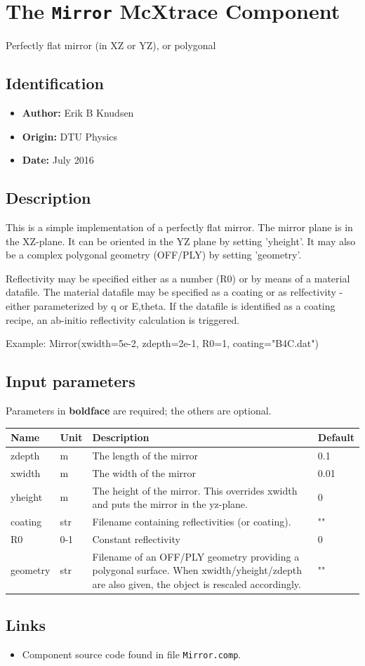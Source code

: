 \section{The \texttt{Mirror} McXtrace Component}
Perfectly flat mirror (in XZ or YZ), or polygonal

\subsection*{Identification}
\begin{itemize}
  \item \textbf{Author:} Erik B Knudsen
  \item \textbf{Origin:} DTU Physics
  \item \textbf{Date:} July 2016
\end{itemize}

\subsection*{Description}
This is a simple implementation of a perfectly flat mirror. The mirror plane is in the XZ-plane. It can be oriented in the YZ plane by setting 'yheight'. It may also be a complex polygonal geometry (OFF/PLY) by setting 'geometry'.

Reflectivity may be specified either as a number (R0) or by means of a material datafile. The material datafile may be specified as a coating or as relfectivity - either parameterized by q or E,theta. If the datafile is identified as a coating recipe, an ab-initio reflectivity calculation is triggered.

Example: Mirror(xwidth=5e-2, zdepth=2e-1, R0=1, coating="B4C.dat")

\subsection*{Input parameters}
Parameters in \textbf{boldface} are required; the others are optional.

\begin{longtable}{p{}p{}p{}p{}}
\toprule
\textbf{Name} & \textbf{Unit} & \textbf{Description} & \textbf{Default} \\
\midrule
\endhead
zdepth & m & The length of the mirror & 0.1 \\
xwidth & m & The width of the mirror & 0.01 \\
yheight & m & The height of the mirror. This overrides xwidth and puts the mirror in the yz-plane. & 0 \\
coating & str & Filename containing reflectivities (or coating). & "" \\
R0 & 0-1 & Constant reflectivity & 0 \\
geometry & str & Filename of an OFF/PLY geometry providing a polygonal surface. When xwidth/yheight/zdepth are also given, the object is rescaled accordingly. & "" \\
\bottomrule
\end{longtable}

\subsection*{Links}
\begin{itemize}
  \item Component source code found in file \texttt{Mirror.comp}.
\end{itemize}
